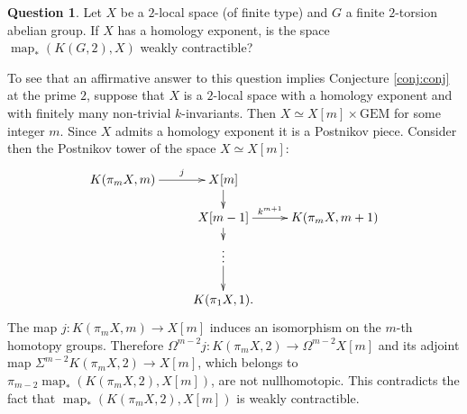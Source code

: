 \documentclass{conm-p-l}
\theoremstyle{definition}
\newtheorem{quest}[thm]{Question}
\DeclareMathOperator{\map}{map}
\begin{document}
\begin{quest}
Let $X$ be a $2$-local space (of finite type) and $G$ a finite $2$-torsion abelian group. If $X$ has a homology exponent, is the space $\map_*(K(G,2),X)$ weakly contractible?
\end{quest}

To see that an affirmative answer to this question implies Conjecture \ref{conj:conj} at the prime $2$, suppose that $X$ is a $2$-local space with a homology exponent and with finitely many non-trivial $k$-invariants. Then $X\simeq X[m]\times\text{GEM}$ for some integer $m$. Since $X$ admits a homology exponent it is a Postnikov piece. Consider then the Postnikov tower of the space $X\simeq X[m]$:
$$\xymatrix@R=0.5cm{
K(\pi_mX,m)\ar[r]^-j &X[m]\ar[d]\\
&X[m-1]\ar[d]\ar[r]^-{k^{m+1}} &K(\pi_mX,m+1)\\
&\vdots\ar[d]\\
&K(\pi_1X,1).
}$$ The map $j:K(\pi_m X,m)\to X[m]$ induces an isomorphism on the $m$-th homotopy groups. Therefore $\Omega^{m-2}j:K(\pi_m X,2)\to\Omega^{m-2}X[m]$ and its adjoint map $\Sigma^{m-2}K(\pi_m X,2)\to X[m]$, which belongs to $\pi_{m-2}\map_*(K(\pi_m X,2),X[m])$, are not nullhomotopic. This contradicts the fact that $\map_*(K(\pi_mX,2),X[m])$ is weakly contractible.
\end{document}
